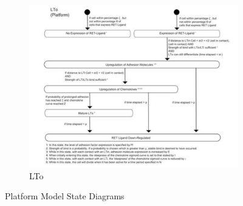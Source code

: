 \documentclass{UoYCSproject}
\begin{document}
\begin{figure}[htp]\ContinuedFloat
\centering
\begin{subfigure}{0.95\textwidth}
\centering
\includegraphics[width=\textwidth]{Appendix/Models/Platform/LTo}
\caption{LTo}
\end{subfigure}

\caption{Platform Model State Diagrams\cite{kieran_thesis, kieran_methodology}}
\label{fig:platform_state_diagrams}
\end{figure}
\end{document}
